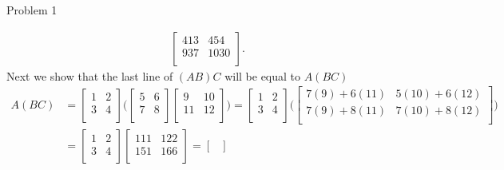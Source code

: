 \begin{problem}{Problem 1}
\begin{highlight}[Solution]
\begin{align*}
\begin{bmatrix}
                413 & 454 \\
                937 & 1030 \\
            \end{bmatrix}.
        \end{align*}
        Next we show that the last line of $(AB)C$ will be equal to $A(BC)$
        \begin{align*}
            A(BC) & = 
            \begin{bmatrix}
                1 & 2 \\
                3 & 4 \\
            \end{bmatrix}
            \Bigg( 
                \begin{bmatrix}
                    5 & 6 \\
                    7 & 8 \\
                \end{bmatrix}
                \begin{bmatrix}
                    9 & 10 \\
                    11 & 12 \\
                \end{bmatrix}
            \Bigg) 
            = 
            \begin{bmatrix}
                1 & 2 \\
                3 & 4 \\
            \end{bmatrix}
            \Bigg(
                \begin{bmatrix}
                    7(9) + 6(11) & 5(10) + 6(12) \\
                    7(9) + 8(11) & 7(10) + 8(12) \\
                \end{bmatrix}
            \Bigg) \\
            & = 
            \begin{bmatrix}
                1 & 2 \\
                3 & 4 \\
            \end{bmatrix}
            \begin{bmatrix}
                111 & 122 \\
                151 & 166 \\
            \end{bmatrix}
            = 
            \begin{bmatrix}

\end{bmatrix}
\end{align*}
\end{highlight}
\end{problem}
